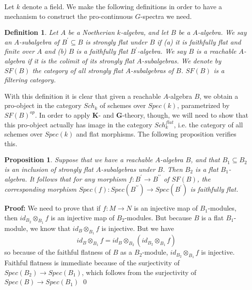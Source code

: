 \documentclass[11pt]{article}
\def \bK{\mathbf K}
\newcommand\mfk{\mathbf G}
\newtheorem{Proposition}{Proposition}[section]
\newtheorem{Definition}{Definition}[section]
\newenvironment{Proof}{\par\noindent\textbf{Proof:}}
{\qed}
\begin{document}
Let  $k$ denote a field.    We make the following definitions in order to have a mechanism to construct the pro-continuous $G$-spectra we need.  
\begin{Definition}
   Let $A$ be a Noetherian $k$-algebra, and let $B$ be a $A$-algebra.  We say an $A$-subalgebra of $B^{\prime} \subseteq B $ is {\em strongly flat under $B$} if {\em(a)} it is faithfully flat and finite over $A$ and {\em (b)} $B$ is a faithfully flat $B^{\prime}$-algebra.  We say $B$ is a {\em reachable} $A$-algebra if it is the colimit of its strongly flat $A$-subalgebras. We denote by $SF(B)$ the category of all strongly flat $A$-subalgebras of $B$.  $SF(B)$ is a filtering category.  
\end{Definition}

With this definition it is clear that given a reachable $A$-algebra $B$, we obtain a pro-object in the category $Sch_k$ of schemes over $Spec(k)$, parametrized by $SF(B)^{op}$.    In order to apply $\bK$- and $\mfk$-theory, though, we will need to show that this pro-object actually has image in the category $Sch_k^{flat}$, i.e. the category of all schemes over $Spec(k)$ and flat morphisms.  The following proposition verifies  this. 

\begin{Proposition}\label{Bfunctoriality} Suppose that we have a reachable $A$-algebra $B$, and that $B_1 \subseteq B_2 $ is an inclusion of strongly flat  $A$-subalgebras under  $B$.  Then $B_2$ is a flat $B_1$-algebra.  It follows that  for any morphism $f:B^{\prime} \rightarrow B^{\prime \prime}$ of $SF(B)$, the corresponding morphism $Spec(f): Spec(B^{\prime \prime}) \rightarrow Spec(B^{\prime})$ is faithfully flat.  
    \end{Proposition}
    \begin{Proof} We need to prove that if $f: M \rightarrow N$ is an injective map of $B_1$-modules, then $id_{B_2} \otimes _{B_1} f$ is an injective map  of $B_2$-modules. But because $B$ is a flat $B_1$-module, we know that $id_{B} \otimes_{B_1}  f$ is injective.  But we have 
    $$ id_{B} \otimes_{B_1}  f  = id_B \otimes _{B_2}(id_{B_2} \otimes _{B_1} f)
    $$
    so because of the faithful flatness of $B$ as a $B_2$-module, $id_{B_2} \otimes _{B_1} f$ is injective. Faithful flatness is immediate because of the surjectivity of $Spec(B_2) \rightarrow Spec(B_1)$, which follows from the surjectivity of $Spec(B) \rightarrow Spec(B_1)$
    \end{Proof}

 
\end{document}
